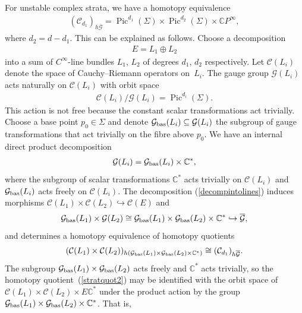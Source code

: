 \documentclass[pdftex]{sigma}
\numberwithin{equation}{section}
\begin{document}
For unstable complex strata, we have a homotopy equivalence
\begin{gather}\label{stratquot2} ({\mathcal C}_{d_1})_{h\overline{{\mathcal G}}} = \operatorname{Pic}^{d_1}(\Sigma) \times \operatorname{Pic}^{d_2}(\Sigma) \times {\mathbb C} P^{\infty} ,
\end{gather}
where $d_2 = d-d_1$. This can be explained as follows. Choose a decomposition
\begin{gather}\label{decompintolines} E = L_1 \oplus L_2
\end{gather} into a sum of $C^{\infty}$-line bundles $L_1$, $L_2$ of degrees $d_1$, $d_2$ respectively. Let ${\mathcal C}(L_i)$ denote the space of Cauchy--Riemann operators on~$L_i$. The gauge group ${\mathcal G}(L_i)$ acts naturally on ${\mathcal C}(L_i)$ with orbit space \begin{gather*}{\mathcal C}(L_i)/{\mathcal G}(L_i) = \operatorname{Pic}^{d_i}(\Sigma).\end{gather*}
This action is not free because the constant scalar transformations act trivially. Choose a base point $p_0 \in \Sigma$ and denote ${\mathcal G}_{\rm bas}(L_i) \subseteq {\mathcal G}(L_i)$ the subgroup of gauge transformations that act trivially on the f\/ibre above $p_0$. We have an internal direct product decomposition
\begin{gather*} {\mathcal G}(L_i) = {\mathcal G}_{\rm bas}(L_i) \times {\mathbb C}^* , \end{gather*}
where the subgroup of scalar transformations ${\mathbb C}^*$ acts trivially on ${\mathcal C}(L_i)$ and ${\mathcal G}_{\rm bas}(L_i)$ acts freely on ${\mathcal C}(L_i)$. The decomposition (\ref{decompintolines}) induces morphisms ${\mathcal C}(L_1) \times {\mathcal C}(L_2) \hookrightarrow {\mathcal C}(E)$ and \begin{gather*} {\mathcal G}_{\rm bas}(L_1) \times {\mathcal G}(L_2) \cong {\mathcal G}_{\rm bas}(L_1) \times {\mathcal G}_{\rm bas}(L_2) \times {\mathbb C}^* \hookrightarrow \overline{{\mathcal G}}, \end{gather*} and determines a homotopy equivalence of homotopy quotients~\cite[Section~7]{AB}
\begin{gather*}({\mathcal C}(L_1) \times {\mathcal C}(L_2))_{h ({\mathcal G}_{\rm bas}(L_1) \times {\mathcal G}_{\rm bas}(L_2) \times {\mathbb C}^*)} \cong ({\mathcal C}_{d_1})_{h\overline{{\mathcal G}}}. \end{gather*}
The subgroup ${\mathcal G}_{\rm bas}(L_1) \times {\mathcal G}_{\rm bas}(L_2)$ acts freely and ${\mathbb C}^*$ acts trivially, so the homotopy quotient~(\ref{stratquot2}) may be identif\/ied with the orbit space of ${\mathcal C}(L_1) \times {\mathcal C}(L_2) \times E{\mathbb C}^* $ under the product action by the group ${\mathcal G}_{\rm bas}(L_1) \times {\mathcal G}_{\rm bas}(L_2) \times {\mathbb C}^*$. That is,
\end{document}
